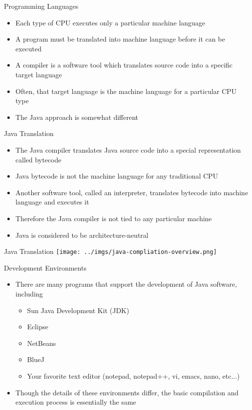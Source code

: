 \documentclass{beamer}
\begin{document}
\begin{frame}{Programming Languages}
\begin{itemize}
\item Each type of CPU executes only a particular machine language
\item A program must be translated into machine language before it can be executed
\item A compiler is a software tool which translates source code into a specific target language
\item Often, that target language is the machine language for a particular CPU type
\item The Java approach is somewhat different
\end{itemize}
\end{frame}

\begin{frame}{Java Translation}
\begin{itemize}
\item The Java compiler translates Java source code into a special representation called bytecode
\item Java bytecode is not the machine language for any traditional CPU
\item Another software tool, called an interpreter, translates bytecode into machine language and executes it
\item Therefore the Java compiler is not tied to any particular machine
\item Java is considered to be architecture-neutral
\end{itemize}
\end{frame}

\begin{frame}{Java Translation}
\texttt{[image: ../imgs/java-compliation-overview.png]}
\end{frame}

\begin{frame}{Development Environments}
\begin{itemize}
\item There are many programs that support the development of Java software, including
\begin{itemize}
\item Sun Java Development Kit (JDK)
\item Eclipse
\item NetBeans
\item BlueJ
\item Your favorite text editor (notepad, notepad++, vi, emacs, nano, etc...)
\end{itemize}
\item Though the details of these environments differ, the basic compilation and execution process is essentially the same
\end{itemize}
\end{frame}
\end{document}
